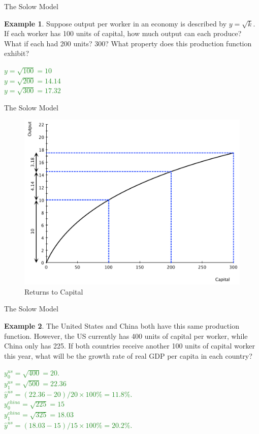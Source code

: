 \documentclass[xcolor={dvipsnames},pdf, hyperref={colorlinks=true, citecolor=ForestGreen, linkcolor=BlueViolet, urlcolor=Magenta}]{beamer}
\theoremstyle{definition}
\newtheorem{exmp}{Example}[section]
\newcommand{\ddp}[1]{{\textcolor{ForestGreen}{#1}}}
\begin{document}
\begin{frame}{The Solow Model}
\begin{exmp} 
	Suppose output per worker in an economy is described by $y = \sqrt{k}$. If each worker has 100 units of capital, how much output can each produce? What if each had 200 units? 300? What property does this production function exhibit?
\end{exmp}
\ddp{\pause $y = \sqrt{100} = 10$ \\ 
\pause	$y = \sqrt{200} = 14.14$ \\
\pause	$y = \sqrt{300} = 17.32$}
\end{frame}

\begin{frame}{The Solow Model}


	\begin{figure}[H]
		\centering
		\includegraphics[scale=.35]{plot83.pdf}
		\caption{Returns to Capital}
\end{figure}

\end{frame}

\begin{frame}{The Solow Model}
\begin{exmp}
	The United States and China both have this same production function. However, the US currently has 400 units of capital per worker, while China only has 225. If both countries receive another 100 units of capital worker this year, what will be the growth rate of real GDP per capita in each country? 
\end{exmp}
\ddp{$y_0^{us} = \sqrt{400} = 20$. \\
	\pause $y_1^{us} = \sqrt{500} = 22.36$ \\
	\pause $\hat{y}^{us} = (22.36-20)/20 \times 100\% = 11.8\%.$ \\ 
\pause	$y_0^{china} = \sqrt{225} = 15$ \\
\pause $y_1^{china} = \sqrt{325} = 18.03$ \\
\pause $\hat{y}^{us} = (18.03-15)/15 \times 100\% = 20.2\%.$} 

\end{frame}
\end{document}
